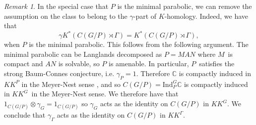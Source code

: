 \documentclass[a4paper,reqno]{amsart}
\numberwithin{equation}{section}
\def\C{\mathbb{C}}
\theoremstyle{definition}
\theoremstyle{remark}
\newtheorem{remark}[thm]{Remark}
\begin{document}
\begin{remark}
In the special case that $P$ is the minimal parabolic, we can remove the assumption on the class to belong to the $\gamma$-part of $K$-homology. Indeed, we have that
$$\gamma K^*(C(G/P)\rtimes \Gamma)= K^*(C(G/P)\rtimes \Gamma),$$
when $P$ is the minimal parabolic. This follows from the following argument. The minimal parabolic can be Langlands decomposed as $P=MAN$ where $M$ is compact and $AN$ is solvable, so $P$ is amenable. In particular, $P$ satisfies the strong Baum-Connes conjecture, i.e. $\gamma_P=1$. Therefore $\C$ is compactly induced in $KK^P$ in the Meyer-Nest sense \cite{meyernest}, and so $C(G/P)=\mathrm{Ind}_P^G\C$ is compactly induced in $KK^G$ in the Meyer-Nest sense. We therefore have that $1_{C(G/P)}\otimes \gamma_G=1_{C(G/P)}$ so $\gamma_G$ acts as the identity on $C(G/P)$ in $KK^G$. We conclude that $\gamma_\Gamma$ acts as the identity on $C(G/P)$ in $KK^\Gamma$.
\end{remark}
\end{document}
